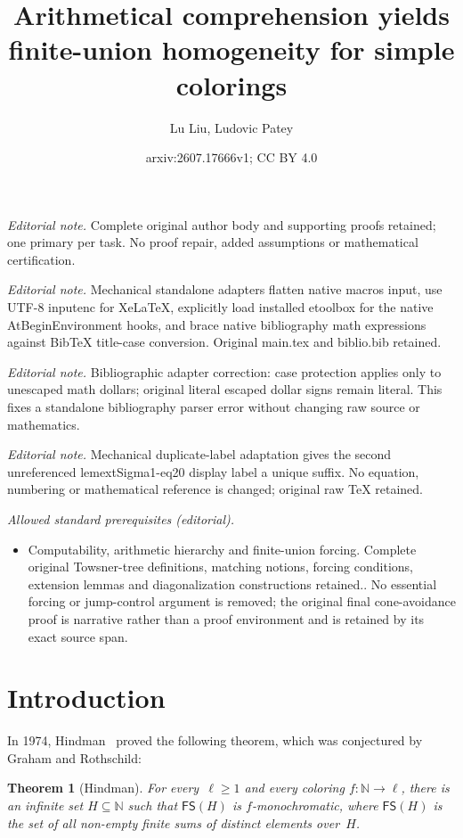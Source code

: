 \documentclass[10pt,a4paper]{article}
\title{Arithmetical comprehension yields finite-union homogeneity for simple colorings}
\author{Lu Liu, Ludovic Patey}
\date{arxiv:2607.17666v1; CC BY 4.0}
\newcommand{\NN}[0]{\mathbb{N}}
\newcommand{\FS}[0]{\mathsf{FS}} %
\newtheorem{theorem}{Theorem}
\numberwithin{theorem}{section}
\begin{document}
\maketitle
\noindent\textit{Editorial note.} Complete original author body and supporting proofs retained; one primary per task. No proof repair, added assumptions or mathematical certification.\par\medskip
\noindent\textit{Editorial note.} Mechanical standalone adapters flatten native macros input, use UTF-8 inputenc for XeLaTeX, explicitly load installed etoolbox for the native AtBeginEnvironment hooks, and brace native bibliography math expressions against BibTeX title-case conversion. Original main.tex and biblio.bib retained.\par\medskip
\noindent\textit{Editorial note.} Bibliographic adapter correction: case protection applies only to unescaped math dollars; original literal escaped dollar signs remain literal. This fixes a standalone bibliography parser error without changing raw source or mathematics.\par\medskip
\noindent\textit{Editorial note.} Mechanical duplicate-label adaptation gives the second unreferenced lemextSigma1-eq20 display label a unique suffix. No equation, numbering or mathematical reference is changed; original raw TeX retained.\par\medskip
\noindent\textit{Allowed standard prerequisites (editorial).}\begin{itemize}
\item Computability, arithmetic hierarchy and finite-union forcing. Complete original Towsner-tree definitions, matching notions, forcing conditions, extension lemmas and diagonalization constructions retained.. No essential forcing or jump-control argument is removed; the original final cone-avoidance proof is narrative rather than a proof environment and is retained by its exact source span.
\end{itemize}\medskip
\section{Introduction}

In 1974, Hindman~\cite{hindmanFiniteSumsSequences1974} proved the following theorem, which was conjectured by Graham and Rothschild:

\begin{theorem}[Hindman]
For every~$\ell \geq 1$ and every coloring $f : \NN \to \ell$, there is an infinite set $H \subseteq \NN$ such that $\FS(H)$ is $f$-monochromatic, where $\FS(H)$ is the set of all non-empty finite sums of distinct elements over~$H$.
\end{theorem}
\end{document}
